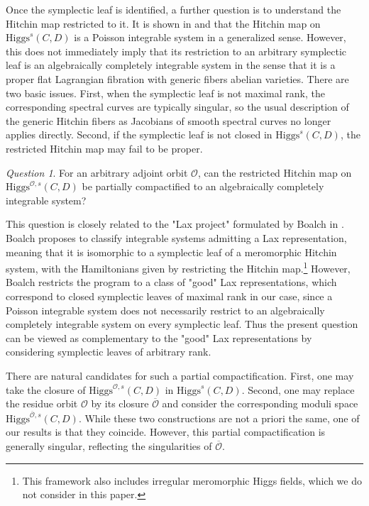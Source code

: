 \documentclass[11pt]{amsart}
\theoremstyle{plain}
\theoremstyle{definition}
\theoremstyle{remark}
\newtheorem{ques}[theorem]{Question}
\newcommand{\cO}{\mathcal O}
\newcommand{\Higgs}{\mathrm{Higgs}}
\begin{document}
Once the symplectic leaf is identified, a further question is to understand the Hitchin map restricted to it. It is shown in \cite[Section 4.7] {Bottacin1995symplectic} and \cite[Section 8.3]{markmanspectral} that the Hitchin map on $\Higgs^s(C, D)$ is a Poisson integrable system in a generalized sense. However, this does not immediately imply that its restriction to an arbitrary symplectic leaf is an algebraically completely integrable system in the sense that it is a proper flat Lagrangian fibration with generic fibers abelian varieties. There are two basic issues. First, when the symplectic leaf is not maximal rank, the corresponding spectral curves are typically singular, so the usual description of the generic Hitchin fibers as Jacobians of smooth spectral curves no longer applies directly. Second, if the symplectic leaf is not closed in $\Higgs^s(C, D)$, the restricted Hitchin map may fail to be proper. 
\begin{ques}
    For an arbitrary adjoint orbit $\cO$, can the restricted Hitchin map on $\Higgs^{\cO,s}(C,D)$ be partially compactified to an algebraically completely integrable system? 
\end{ques}
This question is closely related to the "Lax project"  formulated by Boalch in \cite[Section 1]{boalch2018wild}. Boalch proposes to classify integrable systems admitting a Lax representation, meaning that it is isomorphic to a symplectic leaf of a meromorphic Hitchin system, with the Hamiltonians given by restricting the Hitchin map.\footnote{This framework also includes irregular meromorphic Higgs fields, which we do not consider in this paper.} However, Boalch restricts the program to a class of "good" Lax representations, which correspond to closed symplectic leaves of maximal rank in our case, since a Poisson integrable system does not necessarily restrict to an algebraically completely integrable system on every symplectic leaf. Thus the present question can be viewed as complementary to the "good" Lax representations by considering symplectic leaves of arbitrary rank. 

There are natural candidates for such a partial compactification. First, one may take the closure of $\Higgs^{\cO,s}(C,D)$ in $\Higgs^s(C, D)$. Second, one may replace the residue orbit $\cO$ by its closure $\overline{\cO}$ and consider the corresponding moduli space $\Higgs^{\overline{\cO},s}(C,D)$. While these two constructions are not a priori the same, one of our results is that they coincide. However, this partial compactification is generally singular, reflecting the singularities of $\overline{\cO}.$ 
\end{document}
